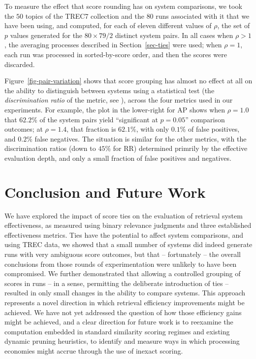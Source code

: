 \documentclass[runningheads,a4paper]{llncs}
\begin{document}
To measure the effect that score rounding has on system comparisons,
we took the $50$ topics of the TREC7 collection and the $80$ runs
associated with it that we have been using, and computed, for each of
eleven different values of $\rho$, the set of $p$ values generated
for the $80\times79/2$ distinct system pairs.
In all cases when $\rho>1$, the averaging processes described in
Section~\ref{sec-ties} were used; when $\rho=1$, each run was
processed in sorted-by-score order, and then the scores were
discarded.

Figure~\ref{fig-pair-variation} shows that score grouping has almost
no effect at all on the ability to distinguish between systems using
a statistical test (the {\emph{discrimination ratio}} of the metric,
see {\citet{sakai07sigir}}), across the four metrics used in our
experiments.
For example, the plot in the lower-right for AP shows when $\rho=1.0$
that $62.2$\% of the system pairs yield ``significant at $p=0.05$''
comparison outcomes; at $\rho=1.4$, that fraction is $62.1\%$, with
only $0.1$\% of false positives, and $0.2$\% false negatives.
The situation is similar for the other metrics, with the
discrimination ratios (down to $45$\% for RR) determined primrily by
the effective evaluation depth, and only a small fraction of false
positives and negatives.
 \section{Conclusion and Future Work}
\label{sec-conclusion}

We have explored the impact of score ties on the evaluation of
retrieval system effectiveness, as measured using binary relevance
judgments and three established effectiveness metrics.
Ties have the potential to affect system comparisons, and using TREC
data, we showed that a small number of systems did indeed generate
runs with very ambiguous score outcomes, but that -- fortunately --
the overall conclusions from those rounds of experimentation were
unlikely to have been compromised.
We further demonstrated that allowing a controlled grouping of scores
in runs -- in a sense, permitting the deliberate introduction of ties
-- resulted in only small changes in the ability to compare systems.
This approach represents a novel direction in which retrieval
efficiency improvements might be achieved.
We have not yet addressed the question of how those efficiency gains
might be achieved, and a clear direction for future work is to
reexamine the computation embedded in standard similarity scoring
regimes and existing dynamic pruning heuristics, to identify and
measure ways in which processing economies might accrue through the
use of inexact scoring.
\end{document}

